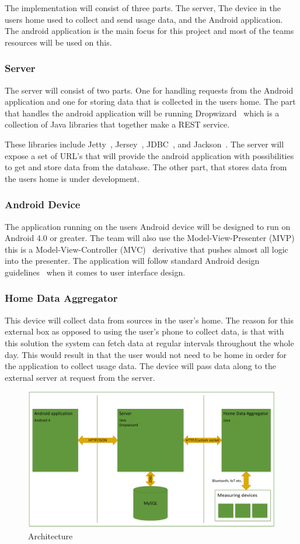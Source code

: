 The implementation will consist of three parts. The server, The device in the users home used to 
collect and send usage data, and the Android application. The android application is the main focus for 
this project and most of the teams resources will be used on this.

\subsubsection{Server}
The server will consist of two parts. One for handling requests from the Android application and one for storing data that is collected in the users home. 
The part that handles the android application will be running Dropwizard~\cite{dropwizard} which is a collection of Java libraries that together make a REST service. 

These libraries include Jetty~\cite{jetty}, Jersey~\cite{jersey}, JDBC~\cite{jdbc}, and Jackson~\cite{jackson}. The server will expose a set of URL's that will provide the android application with 
possibilities to get and store data from the database. The other part, that stores data from the users home is under development.

\subsubsection{Android Device}
The application running on the users Android device will be designed to run on Android 4.0 or greater.
The team will also use the Model-View-Presenter (MVP)~\cite{mvp} this is a Model-View-Controller (MVC)~\cite{mvc} derivative 
that pushes almost all logic into the presenter. The application will follow standard Android design guidelines~\cite{androidgui}
when it comes to user interface design.

\subsubsection{Home Data Aggregator}
This device will collect data from sources in the user's home. The reason for this external box as opposed to using 
the user's phone to collect data, is that with this solution the system can fetch data at regular intervals throughout 
the whole day. This would result in that the user would not need to be home in order for the application to collect 
usage data. The device will pass data along to the external server at request from the server.

\begin{figure}[H]
\includegraphics[width=\textwidth]{ch/implementation/fig/architecture.png}
\caption{Architecture}
\end{figure}